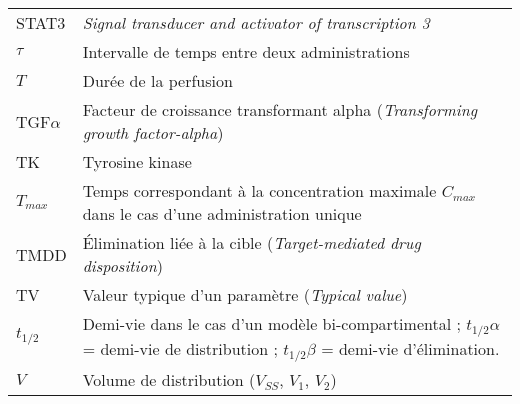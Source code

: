 \begin{tabularx}{30em}{X X}
STAT3 & 	\textit{Signal transducer and activator of transcription 3}\\
$\tau$ & 	Intervalle de temps entre deux administrations\\
$T$ & 	Durée de la perfusion\\
TGF$\alpha$ & 	Facteur de croissance transformant alpha (\textit{Transforming growth factor-alpha})\\
TK & 	Tyrosine kinase \\
$T_{max}$ & 	Temps correspondant à la concentration maximale $C_{max}$ dans le cas d'une administration unique\\
TMDD & 	Élimination liée à la cible (\textit{Target-mediated drug disposition})\\
TV & 	Valeur typique d'un paramètre (\textit{Typical value})\\
$t_{1/2}$ & 	Demi-vie dans le cas d'un modèle bi-compartimental ; $t_{1/2}\alpha$ = demi-vie de distribution ; $t_{1/2}\beta$ = demi-vie d'élimination.\\
$V$ & 	Volume de distribution ($V_{SS}$, $V_1$, $V_2$)\\
\end{tabularx}
